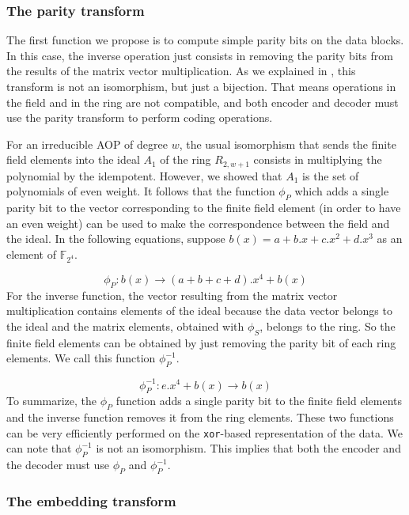 \documentclass[conference]{IEEEtran}
\begin{document}
\subsubsection{The parity transform}
\label{parity_transform}
The first function we propose is to compute simple parity bits on the data blocks. In this case, the inverse operation just consists in removing the parity bits from the results of the matrix vector multiplication. As we explained in \cite{isit}, this transform is not an isomorphism, but just a bijection. That means operations in the field and in the ring are not compatible, and both encoder and decoder must use the parity transform to perform coding operations.

For an irreducible AOP of degree $w$, the usual isomorphism that sends the finite field elements into the ideal $A_1$ of the ring $R_{2,w+1}$ consists in multiplying the polynomial by the idempotent. However, we showed that $A_1$ is the set of polynomials of even weight. It follows that the function $\phi_P$ which adds a single parity bit to the vector corresponding to the finite field element (in order to have an even weight) can be used to make the correspondence between the field and the ideal. In the following equations, suppose $b(x) = a+b.x+c.x^2+d.x^3$ as an element of $\mathbb{F}_{2^4}$.

	\begin{displaymath}
		\phi_P : b(x) \rightarrow (a+b+c+d). x^4 + b(x)
	\end{displaymath}
For the inverse function, the vector resulting from the matrix vector multiplication contains elements of the ideal because the data vector belongs to the ideal and the matrix elements, obtained with $\phi_S$, belongs to the ring. So the finite field elements can be obtained by just removing the parity bit of each ring elements. We call this function $\phi_P^{-1}$. 

	\begin{displaymath}
		\phi_P^{-1} : e.x^4 + b(x) \rightarrow b(x)
	\end{displaymath}
To summarize, the $\phi_P$ function adds a single parity bit to the finite field elements and the inverse function removes it from the ring elements. These two functions can be very efficiently performed on the \texttt{xor}-based representation of the data. We can note that $\phi_P^{-1}$ is not an isomorphism. This implies that both the encoder and the decoder must use $\phi_P$ and $\phi_P^{-1}$.

\subsubsection{The embedding transform}
\label{emb_transform}
\end{document}
